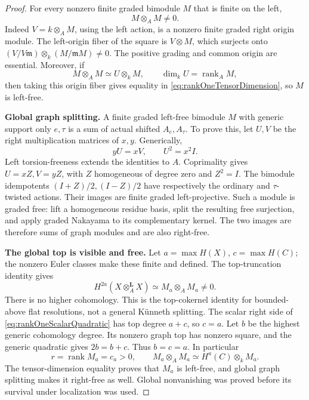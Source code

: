\documentclass[11pt,a4paper]{article}
\theoremstyle{named}\newtheorem{finding}{Finding}[section]
\theoremstyle{definition}\newtheorem{definition}[finding]{Definition}
\theoremstyle{remark}\newtheorem{remark}[finding]{Remark}
\begin{document}
\begin{proof}
For every nonzero finite graded bimodule \(M\) that
is finite on the left,
\begin{equation}\label{eq:rankOneModuleSquareNonzero}
                         M\otimes_AM\ne0.
\end{equation}
Indeed \(V=k\otimes_AM\), using the left action,
is a nonzero finite graded right origin module.
The left-origin fiber of the square is \(V\otimes M\),
which surjects onto
\((V/V\mathfrak m)\otimes_k(M/\mathfrak mM)\ne0\).
The positive grading and common origin are essential.
Moreover, if
\[
 M\otimes_AM\simeq U\otimes_kM,\qquad
 \dim_kU=\operatorname{rank}_AM,
\]
then taking this origin fiber gives equality in
\eqref{eq:rankOneTensorDimension}, so \(M\) is left-free.

\par\smallskip\noindent\textbf{Global graph splitting.}\quad
A finite graded left-free bimodule \(M\) with generic
support only \(e,\tau\) is a sum of actual shifted
\(A_e,A_\tau\). To prove this, let \(U,V\) be the
right multiplication matrices of \(x,y\). Generically,
\[
 yU=xV,\qquad U^2=x^2I.
\]
Left torsion-freeness extends the identities to \(A\).
Coprimality gives \(U=xZ,V=yZ\), with \(Z\) homogeneous
of degree zero and \(Z^2=I\).
The bimodule idempotents \((I+Z)/2,(I-Z)/2\) have
respectively the ordinary and \(\tau\)-twisted actions.
Their images are finite graded left-projective.
Such a module is graded free: lift a homogeneous
residue basis, split the resulting free surjection,
and apply graded Nakayama to its complementary kernel.
The two images are therefore sums of graph modules
and are also right-free.

\par\smallskip\noindent\textbf{The global top is visible and free.}\quad
Let \(a=\max H(X)\), \(c=\max H(C)\); the nonzero
Euler classes make these finite and defined.
The top-truncation identity gives
\[
 H^{2a}(X\otimes_A^{\mathbf L}X)
              \simeq M_a\otimes_AM_a\ne0.
\]
There is no higher cohomology. This is the
top-cokernel identity for bounded-above flat
resolutions, not a general K\"unneth splitting.
The scalar right side of
\eqref{eq:rankOneScalarQuadratic} has top degree
\(a+c\), so \(c=a\).
Let \(b\) be the highest generic cohomology degree.
Its nonzero graph top has nonzero square, and the
generic quadratic gives \(2b=b+c\).
Thus \(b=c=a\). In particular
\[
 r=\operatorname{rank}M_a=c_a>0,
 \qquad
 M_a\otimes_AM_a\simeq H^a(C)\otimes_kM_a.
\]
The tensor-dimension equality proves that \(M_a\)
is left-free, and global graph splitting makes it
right-free as well.
Global nonvanishing was proved before its survival
under localization was used.


\end{proof}
\end{document}
